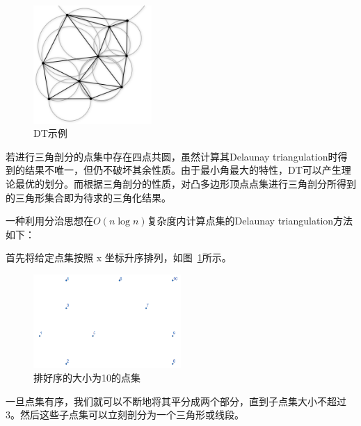 \begin{figure}[htbp]
    \centering
    \includegraphics[width=0.4\textwidth]
    {figures/triangulation-1.png}
    \caption{DT示例}
\end{figure}

若进行三角剖分的点集中存在四点共圆，虽然计算其Delaunay triangulation时得到的结果不唯一，但仍不破坏其余性质。由于最小角最大的特性，DT可以产生理论最优的划分。而根据三角剖分的性质，对凸多边形顶点点集进行三角剖分所得到的三角形集合即为待求的三角化结果。

一种利用分治思想在\(O(n\log n)\)复杂度内计算点集的Delaunay triangulation方法如下：

首先将给定点集按照 x 坐标升序排列，如图~\ref*{DT1}所示。

\begin{figure}[htbp]
    \centering
    \includegraphics[width=0.5\textwidth]
    {figures/DT1.png}
    \caption{排好序的大小为10的点集}
    \label{DT1}
\end{figure}
\newpage
一旦点集有序，我们就可以不断地将其平分成两个部分，直到子点集大小不超过 3。然后这些子点集可以立刻剖分为一个三角形或线段。

